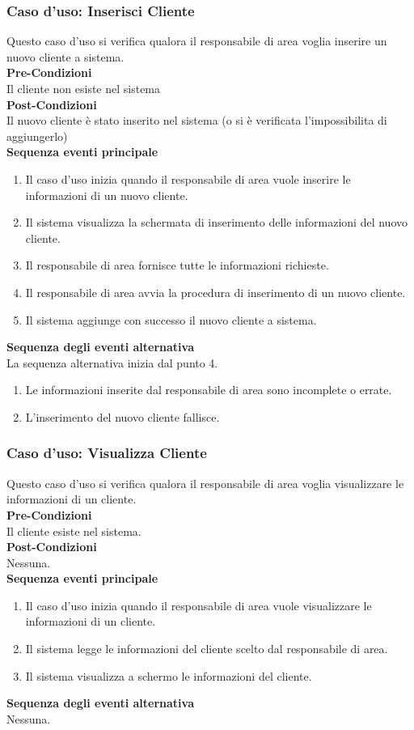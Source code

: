 \documentclass[green, fancy, 11pt]{elegantbook}
\begin{document}
\subsubsection{Caso d'uso: Inserisci Cliente}
\noindent
Questo caso d’uso si verifica qualora il responsabile di area voglia inserire un nuovo cliente a sistema.\\
\textbf{Pre-Condizioni}\\
Il cliente non esiste nel sistema\\
\textbf{Post-Condizioni}\\
Il nuovo cliente è stato inserito nel sistema (o si è verificata l’impossibilita di aggiungerlo)\\
\textbf{Sequenza eventi principale}
\begin{enumerate}
	\item Il caso d’uso inizia quando il responsabile di area vuole inserire le informazioni di un nuovo cliente.
	\item Il sistema visualizza la schermata di inserimento delle informazioni del nuovo cliente.
	\item Il responsabile di area fornisce tutte le informazioni richieste.
	\item Il responsabile di area avvia la procedura di inserimento di un nuovo cliente.
	\item Il sistema aggiunge con successo il nuovo cliente a sistema.
\end{enumerate}
\textbf{Sequenza degli eventi alternativa}\\
La sequenza alternativa inizia dal punto 4.
\begin{enumerate}
	\item Le informazioni inserite dal responsabile di area sono incomplete o errate.
	\item L’inserimento del nuovo cliente fallisce.
\end{enumerate}
\newpage

\subsubsection{Caso d'uso: Visualizza Cliente}
\noindent
Questo caso d’uso si verifica qualora il responsabile di area voglia visualizzare le informazioni di un cliente.\\
\textbf{Pre-Condizioni}\\
Il cliente esiste nel sistema.\\
\textbf{Post-Condizioni}\\
Nessuna.\\
\textbf{Sequenza eventi principale}
\begin{enumerate}
	\item Il caso d’uso inizia quando il responsabile di area vuole visualizzare le informazioni di un cliente.
	\item Il sistema legge le informazioni del cliente scelto dal responsabile di area.
	\item Il sistema visualizza a schermo le informazioni del cliente.
\end{enumerate}
\textbf{Sequenza degli eventi alternativa}\\
Nessuna.
\end{document}
